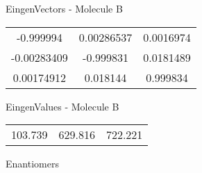 \begin{multicols}{2}
\begin{center}
\vtab
 EingenVectors - Molecule B     \\
\vtab
\begin{tabular}{|c c c|}
-0.999994	 & 	0.00286537	 & 	0.0016974	 \\
-0.00283409	 & 	-0.999831	 & 	0.0181489	 \\
0.00174912	 & 	0.018144	 & 	0.999834
\end{tabular}

\vtab
 EingenValues - Molecule B     \\
\vtab
\begin{tabular}{|c c c|}
103.739	 & 	629.816	 & 	722.221	 \\
\end{tabular}

\end{center}
\end{multicols}
\begin{center}
\vtab
\vtab
\textcolor{NavyBlue}{\Large Enantiomers}
\end{center}

 \newpage

